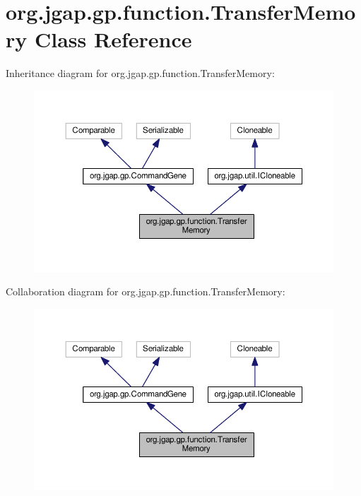 \hypertarget{classorg_1_1jgap_1_1gp_1_1function_1_1_transfer_memory}{\section{org.\-jgap.\-gp.\-function.\-Transfer\-Memory Class Reference}
\label{classorg_1_1jgap_1_1gp_1_1function_1_1_transfer_memory}
}


Inheritance diagram for org.\-jgap.\-gp.\-function.\-Transfer\-Memory\-:
\nopagebreak
\begin{figure}[H]
\begin{center}
\leavevmode
\includegraphics[width=350pt]{classorg_1_1jgap_1_1gp_1_1function_1_1_transfer_memory__inherit__graph}
\end{center}
\end{figure}


Collaboration diagram for org.\-jgap.\-gp.\-function.\-Transfer\-Memory\-:
\nopagebreak
\begin{figure}[H]
\begin{center}
\leavevmode
\includegraphics[width=350pt]{classorg_1_1jgap_1_1gp_1_1function_1_1_transfer_memory__coll__graph}
\end{center}
\end{figure}
